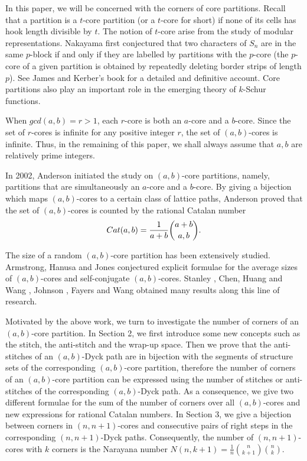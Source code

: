 \documentclass[a4paper,12pt]{article}
\begin{document}

In this paper, we will be concerned with the corners of core partitions. Recall that a partition is a $t$-core partition (or a $t$-core for short) if none of its cells has hook length divisible by $t$.  The notion of $t$-core arise from the study of modular representations. Nakayama  \cite{nakayama} first conjectured that two characters of $S_n$ are in the same $p$-block if and only if they are labelled by partitions with the $p$-core (the $p$-core of a given partition is obtained by repeatedly deleting border strips of length $p$). See James and Kerber's book \cite{JamesKerber} for a detailed and definitive account.
Core partitions also play an important role in the emerging theory of $k$-Schur functions\cite{kschur}.

When $gcd(a,b)=r>1$, each $r$-core is both an $a$-core and a $b$-core. Since the set of $r$-cores is infinite for any positive integer $r$, the set of $(a,b)$-cores is infinite. Thus, in the remaining of this paper, we shall always assume that $a,b$ are relatively prime integers.

In 2002, Anderson \cite{Anderson} initiated the study on $(a,b)$-core partitions, namely, partitions that are simultaneously an $a$-core and a $b$-core. By giving a bijection which maps $(a,b)$-cores to a certain class of lattice paths, Anderson proved that the set of $(a,b)$-cores is counted by the rational Catalan number
\begin{equation}\label{rationalcatalan}
  Cat(a,b)={1\over a+b}{a+b\choose a,b}.
\end{equation}

The size of a random $(a,b)$-core partition  has been extensively studied. Armstrong, Hanusa and Jones \cite{Arm13} conjectured explicit formulae for the average sizes of $(a,b)$-cores and self-conjugate $(a,b)$-cores. Stanley \cite{StanleyCat}, Chen, Huang and Wang \cite{CHW}, Johnson \cite{Johnson}, Fayers \cite{Fayers} and  Wang\cite{VictorWang} obtained many results along this line of research.

Motivated by the above work, we turn to investigate the number of corners of an $(a,b)$-core partition. In Section 2, we first introduce some new concepts such as the stitch, the anti-stitch and the wrap-up space. Then we prove that the anti-stitches of an $(a,b)$-Dyck path are in bijection with the segments of structure sets of the corresponding $(a,b)$-core partition, therefore the number of corners of an $(a,b)$-core partition can be expressed using the number of stitches or anti-stitches of the corresponding $(a,b)$-Dyck path.
As a consequence, we give two different formulae for the sum of the number of corners over all $(a,b)$-cores and new expressions for rational Catalan numbers.
In Section 3, we give a bijection between corners in $(n,n+1)$-cores and consecutive pairs of right steps in the corresponding $(n,n+1)$-Dyck paths. Consequently, the number of $(n,n+1)$-cores with $k$ corners is the Narayana number  $N(n,k+1)=\frac{1}{n} {n\choose k+1}{n\choose k}.$
\end{document}
